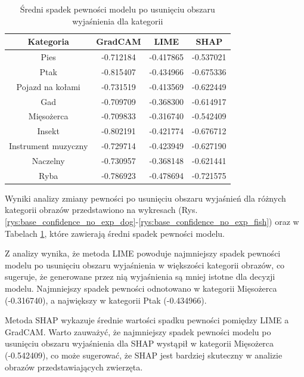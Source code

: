 \begin{table}
	\centering
	\begin{tabular}{|c|c|c|c|}
		\hline
		\textbf{Kategoria}  & \textbf{GradCAM} & \textbf{LIME} & \textbf{SHAP} \\
		\hline
		Pies                & -0.712184        & -0.417865     & -0.537021     \\
		\hline
		Ptak                & -0.815407        & -0.434966     & -0.675336     \\
		\hline
		Pojazd na kołami    & -0.731519        & -0.413569     & -0.622449     \\
		\hline
		Gad                 & -0.709709        & -0.368300     & -0.614917     \\
		\hline
		Mięsożerca          & -0.709833        & -0.316740     & -0.542409     \\
		\hline
		Insekt              & -0.802191        & -0.421774     & -0.676712     \\
		\hline
		Instrument muzyczny & -0.729714        & -0.423949     & -0.627190     \\
		\hline
		Naczelny            & -0.730957        & -0.368148     & -0.621441     \\
		\hline
		Ryba                & -0.786923        & -0.478694     & -0.721575     \\
		\hline
	\end{tabular}
	\caption{Średni spadek pewności modelu po usunięciu obszaru wyjaśnienia dla kategorii}
	\label{tab:category_confidence_no_exp}
\end{table}

Wyniki analizy zmiany pewności po usunięciu obszaru wyjaśnień dla różnych kategorii obrazów przedstawiono na wykresach (Rys. \ref{rys:base_confidence_no_exp_dog}-\ref{rys:base_confidence_no_exp_fish}) oraz w Tabelach \ref{tab:category_confidence_no_exp}, które zawierają średni spadek pewności modelu.

Z analizy wynika, że metoda LIME powoduje najmniejszy spadek pewności modelu po usunięciu obszaru wyjaśnienia w większości kategorii obrazów, co sugeruje, że generowane przez nią wyjaśnienia są mniej istotne dla decyzji modelu.
Najmniejszy spadek pewności odnotowano w kategorii Mięsożerca (-0.316740), a największy w kategorii Ptak (-0.434966).

Metoda SHAP wykazuje średnie wartości spadku pewności pomiędzy LIME a GradCAM.
Warto zauważyć, że najmniejszy spadek pewności modelu po usunięciu obszaru wyjaśnienia dla SHAP wystąpił w kategorii Mięsożerca (-0.542409), co może sugerować, że SHAP jest bardziej skuteczny w analizie obrazów przedstawiających zwierzęta.


